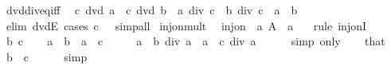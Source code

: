 \begin{isabellebody}
\endisatagproof
{\isafoldproof}%
%
\isadelimproof
\isanewline
%
\endisadelimproof
\isanewline
{}\isamarkupfalse%
\ dvd{\isacharunderscore}{\kern0pt}div{\isacharunderscore}{\kern0pt}eq{\isacharunderscore}{\kern0pt}iff{\isacharcolon}{\kern0pt}\isanewline
\ \ {\isachardoublequoteopen}c\ dvd\ a\ {\isasymLongrightarrow}\ c\ dvd\ b\ {\isasymLongrightarrow}\ a\ div\ c\ {\isacharequal}{\kern0pt}\ b\ div\ c\ {\isasymlongleftrightarrow}\ a\ {\isacharequal}{\kern0pt}\ b{\isachardoublequoteclose}\isanewline
%
\isadelimproof
\ \ %
\endisadelimproof
%
\isatagproof
{}\isamarkupfalse%
\ {\isacharparenleft}{\kern0pt}elim\ dvdE{\isacharcomma}{\kern0pt}\ cases\ {\isachardoublequoteopen}c\ {\isacharequal}{\kern0pt}\ {}{\isachardoublequoteclose}{\isacharparenright}{\kern0pt}\ simp{\isacharunderscore}{\kern0pt}all%
\endisatagproof
{\isafoldproof}%
%
\isadelimproof
\isanewline
%
\endisadelimproof
\isanewline
{}\isamarkupfalse%
\ inj{\isacharunderscore}{\kern0pt}on{\isacharunderscore}{\kern0pt}mult{\isacharcolon}{\kern0pt}\isanewline
\ \ {\isachardoublequoteopen}inj{\isacharunderscore}{\kern0pt}on\ {\isacharparenleft}{\kern0pt}{\isacharparenleft}{\kern0pt}{\isacharasterisk}{\kern0pt}{\isacharparenright}{\kern0pt}\ a{\isacharparenright}{\kern0pt}\ A{\isachardoublequoteclose}\ \ {\isachardoublequoteopen}a\ {\isasymnoteq}\ {}{\isachardoublequoteclose}\isanewline
%
\isadelimproof
%
\endisadelimproof
%
\isatagproof
{}\isamarkupfalse%
\ {\isacharparenleft}{\kern0pt}rule\ inj{\isacharunderscore}{\kern0pt}onI{\isacharparenright}{\kern0pt}\isanewline
\ \ \isamarkupfalse%
\ b\ c\isanewline
\ \ \isamarkupfalse%
\ {\isachardoublequoteopen}a\ {\isacharasterisk}{\kern0pt}\ b\ {\isacharequal}{\kern0pt}\ a\ {\isacharasterisk}{\kern0pt}\ c{\isachardoublequoteclose}\isanewline
\ \ \isamarkupfalse%
\ \isamarkupfalse%
\ {\isachardoublequoteopen}a\ {\isacharasterisk}{\kern0pt}\ b\ div\ a\ {\isacharequal}{\kern0pt}\ a\ {\isacharasterisk}{\kern0pt}\ c\ div\ a{\isachardoublequoteclose}\isanewline
\ \ \ \ \isamarkupfalse%
\ {\isacharparenleft}{\kern0pt}simp\ only{\isacharcolon}{\kern0pt}{\isacharparenright}{\kern0pt}\isanewline
\ \ \isamarkupfalse%
\ that\ \isamarkupfalse%
\ {\isachardoublequoteopen}b\ {\isacharequal}{\kern0pt}\ c{\isachardoublequoteclose}\isanewline
\ \ \ \ \isamarkupfalse%
\ simp\isanewline
{}\isamarkupfalse%
%
\endisatagproof
{\isafoldproof}%

\end{isabellebody}
